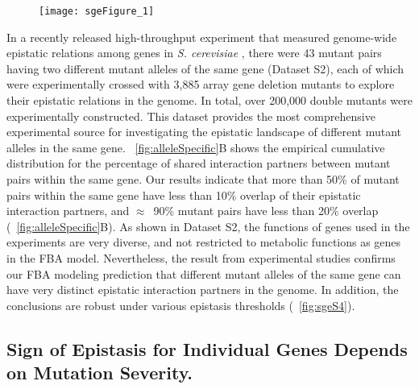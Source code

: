 \label{fig:alleleSpecific}

\begin{figure}[H]
\centering
\texttt{[image: sgeFigure\_1]}
\end{figure}

In a recently released high-throughput experiment that measured
genome-wide epistatic relations among genes in \textit{S. cerevisiae} \citep{Costanzo2010},
there were 43 mutant pairs having two different mutant alleles of the
same gene (Dataset S2), each of which were experimentally crossed with
3,885 array gene deletion mutants to explore their epistatic relations
in the genome. In total, over 200,000 double mutants were
experimentally constructed. This dataset provides the most
comprehensive experimental source for investigating the epistatic
landscape of different mutant alleles in the same
gene. \Fig~\ref{fig:alleleSpecific}B shows
the empirical cumulative distribution for the percentage of shared
interaction partners between mutant pairs within the same gene. Our
results indicate that more than 50\% of mutant pairs within the same
gene have less than 10\% overlap of their epistatic interaction
partners, and $\approx$~90\% mutant pairs have less than 20\% overlap
(\Fig~\ref{fig:alleleSpecific}B). As shown in Dataset S2, the
functions of genes used in the
experiments are very diverse, and not restricted to metabolic
functions as genes in the FBA model. Nevertheless, the result from
experimental studies confirms our FBA modeling prediction that
different mutant alleles of the same gene can have very distinct
epistatic interaction partners in the genome. In addition, the
conclusions are robust under various epistasis thresholds
(\Fig~\ref{fig:sgeS4}).

\subsection{Sign of Epistasis for Individual Genes Depends on Mutation
Severity.}

